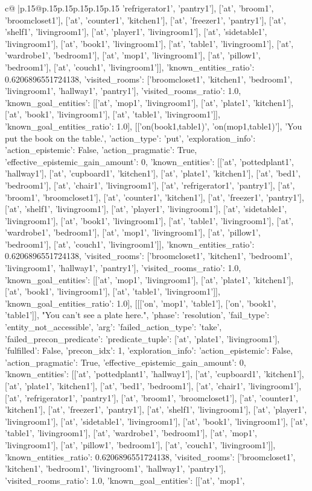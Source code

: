 \documentclass{article}
\begin{document}
{\begin{supertabular}{c@{$\;$}|p{.15\linewidth}@{}p{.15\linewidth}p{.15\linewidth}p{.15\linewidth}p{.15\linewidth}p{.15\linewidth}}
{{{'refrigerator1', 'pantry1'], ['at', 'broom1', 'broomcloset1'], ['at', 'counter1', 'kitchen1'], ['at', 'freezer1', 'pantry1'], ['at', 'shelf1', 'livingroom1'], ['at', 'player1', 'livingroom1'], ['at', 'sidetable1', 'livingroom1'], ['at', 'book1', 'livingroom1'], ['at', 'table1', 'livingroom1'], ['at', 'wardrobe1', 'bedroom1'], ['at', 'mop1', 'livingroom1'], ['at', 'pillow1', 'bedroom1'], ['at', 'couch1', 'livingroom1']], 'known_entities_ratio': 0.6206896551724138, 'visited_rooms': ['broomcloset1', 'kitchen1', 'bedroom1', 'livingroom1', 'hallway1', 'pantry1'], 'visited_rooms_ratio': 1.0, 'known_goal_entities': [['at', 'mop1', 'livingroom1'], ['at', 'plate1', 'kitchen1'], ['at', 'book1', 'livingroom1'], ['at', 'table1', 'livingroom1']], 'known_goal_entities_ratio': 1.0}}], [['on(book1,table1)', 'on(mop1,table1)'], 'You put the book on the table.', {'action_type': 'put', 'exploration_info': {'action_epistemic': False, 'action_pragmatic': True, 'effective_epistemic_gain_amount': 0, 'known_entities': [['at', 'pottedplant1', 'hallway1'], ['at', 'cupboard1', 'kitchen1'], ['at', 'plate1', 'kitchen1'], ['at', 'bed1', 'bedroom1'], ['at', 'chair1', 'livingroom1'], ['at', 'refrigerator1', 'pantry1'], ['at', 'broom1', 'broomcloset1'], ['at', 'counter1', 'kitchen1'], ['at', 'freezer1', 'pantry1'], ['at', 'shelf1', 'livingroom1'], ['at', 'player1', 'livingroom1'], ['at', 'sidetable1', 'livingroom1'], ['at', 'book1', 'livingroom1'], ['at', 'table1', 'livingroom1'], ['at', 'wardrobe1', 'bedroom1'], ['at', 'mop1', 'livingroom1'], ['at', 'pillow1', 'bedroom1'], ['at', 'couch1', 'livingroom1']], 'known_entities_ratio': 0.6206896551724138, 'visited_rooms': ['broomcloset1', 'kitchen1', 'bedroom1', 'livingroom1', 'hallway1', 'pantry1'], 'visited_rooms_ratio': 1.0, 'known_goal_entities': [['at', 'mop1', 'livingroom1'], ['at', 'plate1', 'kitchen1'], ['at', 'book1', 'livingroom1'], ['at', 'table1', 'livingroom1']], 'known_goal_entities_ratio': 1.0}}], [[['on', 'mop1', 'table1'], ['on', 'book1', 'table1']], "You can't see a plate here.", {'phase': 'resolution', 'fail_type': 'entity_not_accessible', 'arg': {'failed_action_type': 'take', 'failed_precon_predicate': {'predicate_tuple': ['at', 'plate1', 'livingroom1'], 'fulfilled': False, 'precon_idx': 1}}, 'exploration_info': {'action_epistemic': False, 'action_pragmatic': True, 'effective_epistemic_gain_amount': 0, 'known_entities': [['at', 'pottedplant1', 'hallway1'], ['at', 'cupboard1', 'kitchen1'], ['at', 'plate1', 'kitchen1'], ['at', 'bed1', 'bedroom1'], ['at', 'chair1', 'livingroom1'], ['at', 'refrigerator1', 'pantry1'], ['at', 'broom1', 'broomcloset1'], ['at', 'counter1', 'kitchen1'], ['at', 'freezer1', 'pantry1'], ['at', 'shelf1', 'livingroom1'], ['at', 'player1', 'livingroom1'], ['at', 'sidetable1', 'livingroom1'], ['at', 'book1', 'livingroom1'], ['at', 'table1', 'livingroom1'], ['at', 'wardrobe1', 'bedroom1'], ['at', 'mop1', 'livingroom1'], ['at', 'pillow1', 'bedroom1'], ['at', 'couch1', 'livingroom1']], 'known_entities_ratio': 0.6206896551724138, 'visited_rooms': ['broomcloset1', 'kitchen1', 'bedroom1', 'livingroom1', 'hallway1', 'pantry1'], 'visited_rooms_ratio': 1.0, 'known_goal_entities': [['at', 'mop1', }}}
\end{supertabular}}
\end{document}
